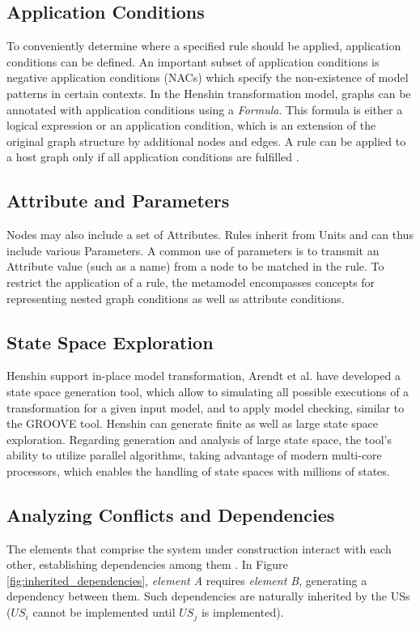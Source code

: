 \subsection*{Application Conditions}
To conveniently determine where a specified rule should be applied, application conditions can be defined. An important subset of application conditions is negative application conditions (NACs) which specify the non-existence of model patterns in certain contexts.
In the Henshin transformation model, graphs can be annotated with application conditions using a \emph{Formula}. This formula is either a logical expression or an application condition, which is an extension of the original graph structure by additional nodes and edges. A rule can be applied to a host graph only if all application conditions are fulfilled \cite{arendt2010henshin}.
\subsection*{Attribute and Parameters}
Nodes may also include a set of Attributes. Rules inherit from Units and can thus include various Parameters. A common use of parameters is to transmit an Attribute value (such as a name) from a node to be matched in the rule. To restrict the application of a rule, the metamodel encompasses concepts for representing nested graph conditions \cite{habel2009correctness} as well as attribute conditions.
\subsection*{State Space Exploration}
Henshin support in-place model transformation, Arendt et al. have developed a state space generation tool, which allow to simulating all possible executions of a transformation for a given input model, and to apply model checking, similar to the GROOVE \cite{kastenberg2006model} tool. Henshin can generate finite as well as large state space exploration. Regarding generation and analysis of large state space, the tool’s ability to utilize parallel algorithms, taking advantage of modern multi-core processors, which enables the handling of state spaces with millions of states. 
\subsection*{Analyzing Conﬂicts and Dependencies}
The elements that comprise the system under construction interact with each other, establishing dependencies among them \cite{kastenberg2006model}. In Figure \ref{fig:inherited_dependencies}, \emph{element A} requires \emph{element B}, generating a dependency between them. Such dependencies are naturally inherited by the USs ($US_i$ 
cannot be implemented until $US_j$ is implemented). 

